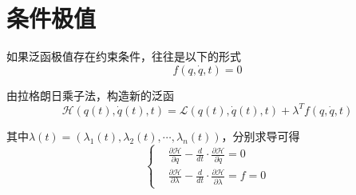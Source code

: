 \section{条件极值}

如果泛函极值存在约束条件，往往是以下的形式
\begin{equation}
    f(q,\dot{q},t)=0
\end{equation}

由拉格朗日乘子法，构造新的泛函
\begin{equation}
    \mathcal{H}(q(t),\dot{q}(t),t)=\mathcal{L}(q(t),\dot{q}(t),t)+\lambda^T f(q,\dot{q},t)
\end{equation}

其中$\lambda(t)=(\lambda_1(t),\lambda_2(t),\cdots,\lambda_n(t))$，分别求导可得
\begin{equation}
    \left\{ 
        \begin{aligned}
        & \frac{\partial \mathcal{H}}{\partial q}-\frac{d}{dt}\cdot \frac{\partial \mathcal{H}}{\partial \dot{q}}=0\\
        & \frac{\partial \mathcal{H}}{\partial \lambda}-\frac{d}{dt}\cdot \frac{\partial \mathcal{H}}{\partial \dot{\lambda}}=f=0
    \end{aligned}
    \right.
\end{equation}

